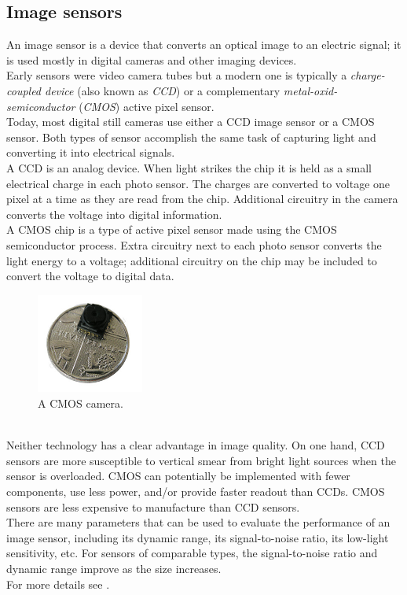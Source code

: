 \subsection{Image sensors}
\label{intro:mobile:image}

An image sensor is a device that converts an optical image to an electric
signal; it is used mostly in digital cameras and other imaging devices.
\\
Early sensors were video camera tubes but a modern one is typically a
\textit{charge-coupled device} (also known as \textit{CCD}) or a complementary
\textit{metal-oxid-semiconductor} (\textit{CMOS}) active pixel sensor.
\\
Today, most digital still cameras use either a CCD image sensor or a
CMOS sensor. Both types of sensor accomplish the same task of capturing
light and converting it into electrical signals.
\\
A CCD is an analog device. When light strikes the chip it is held as a small
electrical charge in each photo sensor. The charges are converted to voltage
one pixel at a time as they are read from the chip. Additional circuitry in
the camera converts the voltage into digital information.
\\
A CMOS chip is a type of active pixel sensor made using the CMOS semiconductor
process. Extra circuitry next to each photo sensor converts the light
energy to a voltage; additional circuitry on the chip may be included
to convert the voltage to digital data.
\begin{figure} [!h]
  \begin{center}
    \includegraphics[width=100pt]{img/cmos_camera.jpg}
    \caption{A CMOS camera.}
    \label{fig:cmos_camera}
  \end{center}
\end{figure}
\\
Neither technology has a clear advantage in image quality. On one hand,
CCD sensors are more susceptible to vertical smear from bright light sources
when the sensor is overloaded.
CMOS can potentially be implemented with fewer components, use less power,
and/or provide faster readout than CCDs.
CMOS sensors are less expensive to manufacture than CCD sensors.
\\
There are many parameters that can be used to evaluate the performance
of an image sensor, including its dynamic range, its signal-to-noise ratio,
its low-light sensitivity, etc. For sensors of comparable types,
the signal-to-noise ratio and dynamic range improve as the size increases.
\\
For more details see \cite{wiki:image_sensor}.

